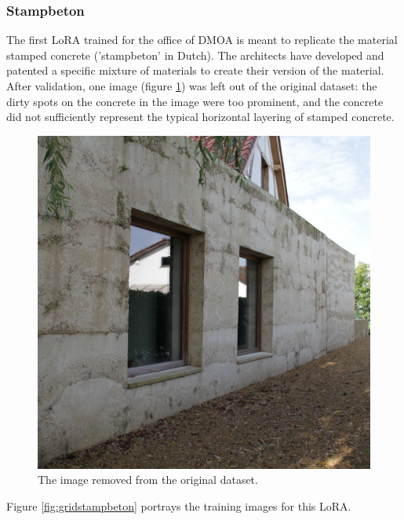 \subsubsection{Stampbeton}
The first LoRA trained for the office of DMOA is meant to replicate the material stamped concrete ('stampbeton' in Dutch). The architects have developed and patented a specific mixture of materials to create their version of the material.\\
After validation, one image (figure \ref{fig:stampbetonomittedimage}) was left out of the original dataset: the dirty spots on the concrete in the image were too prominent, and the concrete did not sufficiently represent the typical horizontal layering of stamped concrete.
\begin{figure}[H]
    \centering
    \includegraphics[width=0.24\linewidth]{Images//LoRAs//STAMPBETON/12.jpg}
    \caption{The image removed from the original dataset.}
    \label{fig:stampbetonomittedimage}
\end{figure}
Figure \ref{fig:gridstampbeton} portrays the training images for this LoRA.
\newcommand{\cellwidth}{0.24\textwidth}
